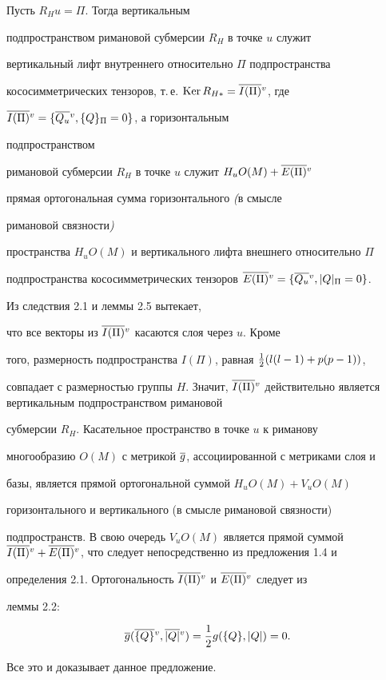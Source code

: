 \begin{props} Пусть $R_Hu=\Pi $. Тогда вертикальным


подпространством римановой субмерсии $R_H$ в точке $u$ служит


вертикальный лифт внутреннего относительно $\Pi$ подпространства


кососимметрических тензоров, т.\,е. $\operatorname{Ker} R_{H*}=\overline {I(\Pi )}{}^v$, где


$\overline {I(\Pi )}{}^v=\{ \overline {Q_u}{}^v, \{ Q\} _\Pi =0\} $, а горизонтальным


подпространством


римановой субмерсии $R_H$ в точке $u$ служит $H_uO(M)+\overline {E(\Pi )}{}^v$


прямая ортогональная сумма горизонтального {\em (}в смысле


римановой связности{\em )}


пространства $H_uO(M)$ и вертикального лифта внешнего относительно $\Pi $


подпространства кососимметрических тензоров $\olv {E(\Pi )}=\{ \olv {Q_u},


|Q|_\Pi =0\} $.


\end{props}





\begin{pf} Из следствия 2.1 и леммы 2.5 вытекает,


что все векторы из $\overline {I(\Pi )}{}^v$ касаются слоя через $u$. Кроме


того, размерность подпространства $I(\Pi )$, равная $\frac12 (l(l-1)+p(p-1))$,


совпадает с размерностью группы $H$. Значит, $\olv


{I(\Pi )}$ действительно является вертикальным подпространством римановой


субмерсии $R_H$. Касательное пространство в точке $u$ к риманову


многообразию $O(M)$ с метрикой $\overline {g}$, ассоциированной с метриками слоя и


базы, является прямой ортогональной суммой $H_uO(M)+V_uO(M)$


горизонтального и вертикального (в смысле римановой связности)


подпространств. В свою очередь $V_uO(M)$ является прямой суммой $\olv


{I(\Pi )}+\olv {E(\Pi )}$, что следует непосредственно из предложения 1.4 и


определения 2.1. Ортогональность $\overline {I(\Pi )}{}^v$ и $\overline {E(\Pi )}{}^v$ следует из


леммы 2.2:


$$


\ol g(\olv {\{ Q\} },\olv {|Q|})=\1 g(\{ Q\} ,|Q|)=0.


$$


Все это и доказывает данное предложение.


\end{pf}





